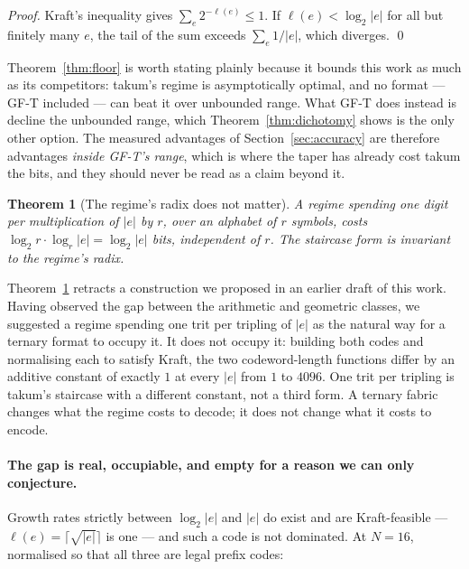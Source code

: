 \documentclass[11pt]{article}
\newtheorem{theorem}{Theorem}
\theoremstyle{definition}
\begin{document}
\begin{proof}
Kraft's inequality gives $\sum_e 2^{-\ell(e)} \leq 1$. If $\ell(e) < \log_2|e|$
for all but finitely many $e$, the tail of the sum exceeds
$\sum_e 1/|e|$, which diverges. \qed
\end{proof}

Theorem~\ref{thm:floor} is worth stating plainly because it bounds this work as
much as its competitors: takum's regime is asymptotically optimal, and no format
--- GF-T included --- can beat it over unbounded range. What GF-T does instead is
decline the unbounded range, which Theorem~\ref{thm:dichotomy} shows is the only
other option. The measured advantages of Section~\ref{sec:accuracy} are therefore
advantages \emph{inside GF-T's range}, which is where the taper has already cost
takum the bits, and they should never be read as a claim beyond it.

\begin{theorem}[The regime's radix does not matter]
\label{thm:radixinv}
A regime spending one digit per multiplication of $|e|$ by $r$, over an alphabet
of $r$ symbols, costs $\log_2 r \cdot \log_r |e| = \log_2 |e|$ bits, independent
of $r$. The staircase form is invariant to the regime's radix.
\end{theorem}

Theorem~\ref{thm:radixinv} retracts a construction we proposed in an earlier draft
of this work. Having observed the gap between the arithmetic and geometric
classes, we suggested a regime spending one trit per tripling of $|e|$ as the
natural way for a ternary format to occupy it. It does not occupy it: building
both codes and normalising each to satisfy Kraft, the two codeword-length
functions differ by an additive constant of exactly $1$ at every $|e|$ from $1$ to
$4096$. One trit per tripling is takum's staircase with a different constant, not
a third form. A ternary fabric changes what the regime costs to decode; it does
not change what it costs to encode.

\paragraph{The gap is real, occupiable, and empty for a reason we can only
conjecture.} Growth rates strictly between $\log_2|e|$ and $|e|$ do exist and are
Kraft-feasible --- $\ell(e) = \lceil\sqrt{|e|}\rceil$ is one --- and such a code
is not dominated. At $N = 16$, normalised so that all three are legal prefix
codes:
\end{document}
